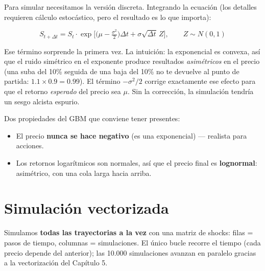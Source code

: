 \documentclass[
  spanish,
  letterpaper,
  DIV=11,
  numbers=noendperiod]{scrreprt}
\providecommand{\tightlist}{%
  \setlength{\itemsep}{0pt}\setlength{\parskip}{0pt}}
\begin{document}
Para simular necesitamos la versión discreta. Integrando la ecuación
(los detalles requieren cálculo estocástico, pero el resultado es lo que
importa):

\[S_{t+\Delta t} = S_t \cdot \exp\!\Big[\big(\mu - \tfrac{\sigma^2}{2}\big)\Delta t + \sigma \sqrt{\Delta t} \, Z\Big], \qquad Z \sim N(0,1)\]

\begin{tcolorbox}[enhanced jigsaw, bottomrule=.15mm, colback=white, opacitybacktitle=0.6, arc=.35mm, toprule=.15mm, opacityback=0, breakable, titlerule=0mm, left=2mm, coltitle=black, colbacktitle=quarto-callout-note-color!10!white, colframe=quarto-callout-note-color-frame, leftrule=.75mm, toptitle=1mm, bottomtitle=1mm, title=\textcolor{quarto-callout-note-color}{\faInfo}\hspace{0.5em}{¿De dónde sale el −σ²/2?}, rightrule=.15mm]

Ese término sorprende la primera vez. La intuición: la exponencial es
convexa, así que el ruido simétrico en el exponente produce resultados
\emph{asimétricos} en el precio (una suba del 10\% seguida de una baja
del 10\% no te devuelve al punto de partida: \(1.1 \times 0.9 = 0.99\)).
El término \(-\sigma^2/2\) corrige exactamente ese efecto para que el
retorno \emph{esperado} del precio sea \(\mu\). Sin la corrección, la
simulación tendría un sesgo alcista espurio.

\end{tcolorbox}

Dos propiedades del GBM que conviene tener presentes:

\begin{itemize}
\tightlist
\item
  El precio \textbf{nunca se hace negativo} (es una exponencial) ---
  realista para acciones.
\item
  Los retornos logarítmicos son normales, así que el precio final es
  \textbf{lognormal}: asimétrico, con una cola larga hacia arriba.
\end{itemize}

\section{Simulación vectorizada}\label{simulaciuxf3n-vectorizada}

Simulamos \textbf{todas las trayectorias a la vez} con una matriz de
shocks: filas = pasos de tiempo, columnas = simulaciones. El único bucle
recorre el tiempo (cada precio depende del anterior); las 10.000
simulaciones avanzan en paralelo gracias a la vectorización del Capítulo
5.
\end{document}
